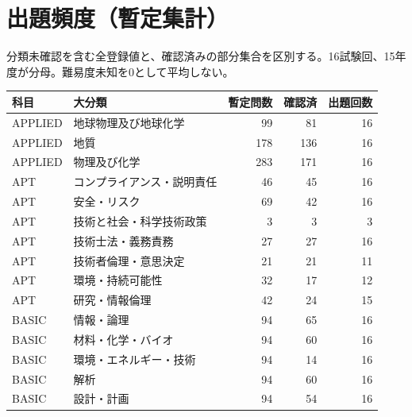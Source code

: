\chapter{出題頻度（暫定集計）}
分類未確認を含む全登録値と、確認済みの部分集合を区別する。16試験回、15年度が分母。難易度未知を0として平均しない。
\begin{longtable}{p{.16\linewidth}p{.42\linewidth}rrr}
科目 & 大分類 & 暫定問数 & 確認済 & 出題回数\\\hline
APPLIED & 地球物理及び地球化学 & 99 & 81 & 16\\
APPLIED & 地質 & 178 & 136 & 16\\
APPLIED & 物理及び化学 & 283 & 171 & 16\\
APT & コンプライアンス・説明責任 & 46 & 45 & 16\\
APT & 安全・リスク & 69 & 42 & 16\\
APT & 技術と社会・科学技術政策 & 3 & 3 & 3\\
APT & 技術士法・義務責務 & 27 & 27 & 16\\
APT & 技術者倫理・意思決定 & 21 & 21 & 11\\
APT & 環境・持続可能性 & 32 & 17 & 12\\
APT & 研究・情報倫理 & 42 & 24 & 15\\
BASIC & 情報・論理 & 94 & 65 & 16\\
BASIC & 材料・化学・バイオ & 94 & 60 & 16\\
BASIC & 環境・エネルギー・技術 & 94 & 14 & 16\\
BASIC & 解析 & 94 & 60 & 16\\
BASIC & 設計・計画 & 94 & 54 & 16\\
\end{longtable}
